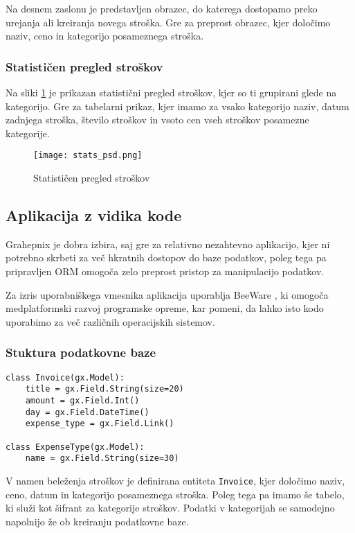 \documentclass[a4paper,12pt,openright]{book}
\begin{document}
    Na desnem zaslonu je predstavljen obrazec, do katerega dostopamo preko urejanja ali kreiranja novega stroška. Gre za preprost obrazec, kjer določimo naziv, ceno in kategorijo posameznega stroška.

    \subsubsection{Statističen pregled stroškov}
    Na sliki \ref{stats_screen} je prikazan statistični pregled stroškov, kjer so ti grupirani glede na kategorijo. Gre za tabelarni prikaz, kjer imamo za vsako kategorijo naziv, datum zadnjega stroška, število stroškov in vsoto cen vseh stroškov posamezne kategorije.

    \begin{figure}[H]
        \centerline{\texttt{[image: stats\_psd.png]}}
        \caption{Statističen pregled stroškov}
        \label{stats_screen}
    \end{figure}

    \subsection{Aplikacija z vidika kode}

    Grahepnix je dobra izbira, saj gre za relativno nezahtevno aplikacijo, kjer ni potrebno skrbeti za več hkratnih dostopov do baze podatkov, poleg tega pa pripravljen ORM omogoča zelo preprost pristop za manipulacijo podatkov.

    Za izris uporabniškega vmesnika aplikacija uporablja BeeWare \cite{BEE_WARE}, ki omogoča medplatformski razvoj programske opreme, kar pomeni, da lahko isto kodo uporabimo za več različnih operacijskih sistemov.

    \subsubsection{Stuktura podatkovne baze}

\begin{verbatim}
class Invoice(gx.Model):
    title = gx.Field.String(size=20)
    amount = gx.Field.Int()
    day = gx.Field.DateTime()
    expense_type = gx.Field.Link()

class ExpenseType(gx.Model):
    name = gx.Field.String(size=30)
\end{verbatim}

    \noindent
    V namen beleženja stroškov je definirana entiteta {\tt Invoice}, kjer določimo naziv, ceno, datum in kategorijo posameznega stroška.
    Poleg tega pa imamo še tabelo, ki služi kot šifrant za kategorije stroškov. Podatki v kategorijah se samodejno napolnijo že ob kreiranju podatkovne baze.
\end{document}
